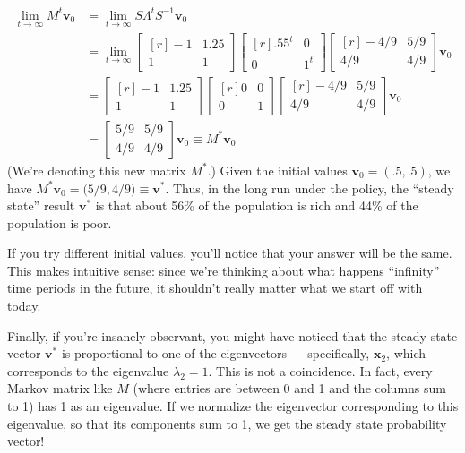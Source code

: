 \documentclass[10pt]{amsart}
\begin{document}
\begin{align*}
\lim_{t\to\infty} M^t \mathbf{v}_0 &= \lim_{t\to\infty}  S \Lambda^t S^{-1} \mathbf{v}_0 \\
&= \lim_{t \to \infty} \left[\begin{matrix*}[r]
-1 & 1.25 \\ 1 & 1
\end{matrix*}\right] %
\left[\begin{matrix*}[r]
.55^t & 0 \\ 0 & 1^t
\end{matrix*}\right]%
\left[\begin{matrix*}[r]
-4/9 & 5/9 \\ 4/9 & 4/9
\end{matrix*}\right] \mathbf{v}_0 \\
&= \left[\begin{matrix*}[r]
-1 & 1.25 \\ 1 & 1
\end{matrix*}\right] %
\left[\begin{matrix*}[r]
0 & 0 \\ 0 & 1
\end{matrix*}\right]%
\left[\begin{matrix*}[r]
-4/9 & 5/9 \\ 4/9 & 4/9
\end{matrix*}\right] \mathbf{v}_0 \\
&= \left[\begin{matrix}
5/9 & 5/9 \\ 4/9 & 4/9
\end{matrix}\right]\mathbf{v}_0 \equiv M^* \mathbf{v}_0
\end{align*}
(We're denoting this new matrix $M^*$.) Given the initial values $\mathbf{v}_0 = (.5, .5)$, we have $M^* \mathbf{v}_0 = \big(5/9, 4/9\big) \equiv \mathbf{v}^*$. Thus, in the long run under the policy, the ``steady state'' result $\mathbf{v}^*$ is that about 56\% of the population is rich and 44\% of the population is poor. 

If you try different initial values, you'll notice that your answer will be the same. This makes intuitive sense: since we're thinking about what happens ``infinity'' time periods in the future, it shouldn't really matter what we start off with today. 

Finally, if you're insanely observant, you might have noticed that the steady state vector $\mathbf{v}^*$ is proportional to one of the eigenvectors --- specifically, $\mathbf{x}_2$, which corresponds to the eigenvalue $\lambda_2 = 1$. This is not a coincidence. In fact, every Markov matrix like $M$ (where entries are between 0 and 1 and the columns sum to 1) has 1 as an eigenvalue. If we normalize the eigenvector corresponding to this eigenvalue, so that its components sum to 1, we get the steady state probability vector! 
\end{document}
